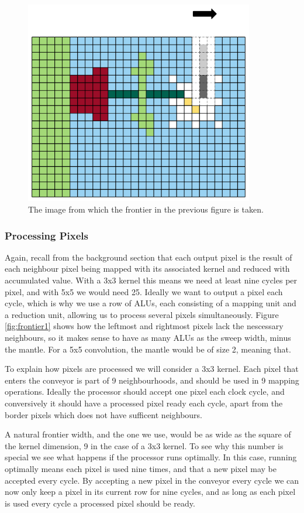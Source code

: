 \begin{figure}[h!]
    \centering
    \includegraphics[width=10cm]{img/frontier2.png}
    \caption{The image from which the frontier in the previous figure is taken.}
    \label{fig:frontier2}
\end{figure}

\subsubsection{Processing Pixels}
Again, recall from the background section that each output pixel is the result of each neighbour pixel being mapped with its associated kernel and reduced with accumulated value.
With a 3x3 kernel this means we need at least nine cycles per pixel, and with 5x5 we would need 25.
Ideally we want to output a pixel each cycle, which is why we use a row of ALUs, each consisting of a mapping unit and a reduction unit, allowing us to process several pixels simultaneously.
Figure \ref{fig:frontier1} shows how the leftmost and rightmost pixels lack the nescessary neighbours, so it makes sense to have as many ALUs as the sweep width, minus the mantle.
For a 5x5 convolution, the mantle would be of size 2, meaning that.

To explain how pixels are processed we will consider a 3x3 kernel.
Each pixel that enters the conveyor is part of 9 neighbourhoods, and should be used in 9 mapping operations.
Ideally the processor should accept one pixel each clock cycle, and conversively it should have a processed pixel ready each cycle, apart from the border pixels which does not have sufficent neighbours.


A natural frontier width, and the one we use, would be as wide as the square of the kernel dimension, 9 in the case of a 3x3 kernel.
To see why this number is special we see what happens if the processor runs optimally.
In this case, running optimally means each pixel is used nine times, and that a new pixel may be accepted every cycle.
By accepting a new pixel in the conveyor every cycle we can now only keep a pixel in its current row for nine cycles, and as long as each pixel is used every cycle a processed pixel should be ready.

